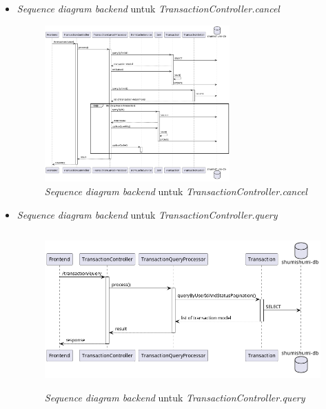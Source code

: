 \documentclass[a4paper]{article}
\begin{document}
\begin{enumerate}
\begin{enumerate}
\begin{itemize}
            \newpage
            \item \textit{Sequence diagram backend} untuk \textit{TransactionController.cancel}
            \begin{figure}[h]
                \centering
                \includegraphics*[height=6cm]{diagram/sequence diagram/BE/transaction controller/cancel/cancel.png}
                \caption{\textit{Sequence diagram backend} untuk \textit{TransactionController.cancel}}
            \end{figure}

            \item \textit{Sequence diagram backend} untuk \textit{TransactionController.query}
            \begin{figure}[h]
                \centering
                \includegraphics*[height=6cm]{diagram/sequence diagram/BE/transaction controller/query/query.png}
                \caption{\textit{Sequence diagram backend} untuk \textit{TransactionController.query}}
            \end{figure}


\end{itemize}
\end{enumerate}
\end{enumerate}
\end{document}
